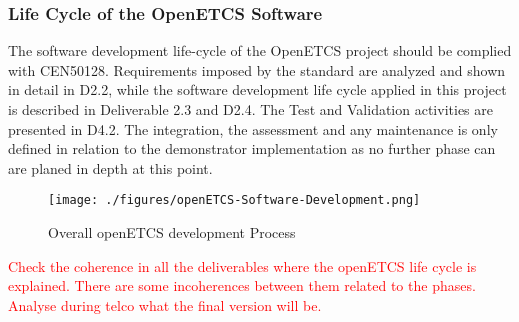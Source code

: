\documentclass{template/openetcs_article}
\begin{document}
\subsubsection{Life Cycle of the OpenETCS Software}
The software development life-cycle of the OpenETCS project should be complied with CEN50128. Requirements imposed by the standard are analyzed and shown in detail in D2.2, while the software development life cycle applied in this project is described in Deliverable 2.3 and D2.4. The Test and Validation activities are presented in D4.2. The integration, the assessment and any maintenance is only defined in relation to the demonstrator implementation as no further phase can are planed in depth at this point.

\begin{figure}[H]
\centering
\texttt{[image: ./figures/openETCS-Software-Development.png]}
\caption[Overall safety process]{Overall openETCS development Process}
\label{fig:DevelopmentProcess}
\end{figure}


\textcolor{red}{Check the coherence in all the deliverables where the openETCS life cycle is explained. There are some incoherences between them related to the phases. Analyse during telco what the final version will be.}
\end{document}
